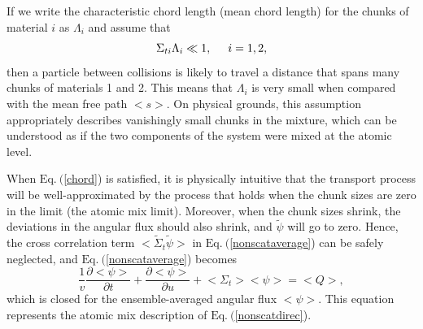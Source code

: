 \documentclass[12pt]{article}
\newcommand{\bl}{\big<}
\newcommand{\bg}{\big>}
\newcommand{\n}{ \noindent}
\begin{document}
If we write the characteristic chord length (mean chord length) for the chunks of material $i$ as $\Lambda_i$ and assume that
\begin{equation}\label{chord}
\Sigma_{ti}\Lambda_i \ll 1, \hspace{0.5 cm} i=1,2,
\end{equation}
then a particle between collisions is likely to travel a distance that spans many chunks of materials 1 and 2.
This means that $\Lambda_i$ is very small when compared with the mean free path $\bl s\bg$.
On physical grounds, this assumption appropriately describes vanishingly small chunks in the mixture, which can be understood as if the two components of the system were mixed at the atomic level.

When $\textrm{Eq.}\ ($\ref{chord}) is satisfied, it is physically intuitive that the transport process will be well-approximated by the process that holds when the chunk
sizes are zero in the limit (the atomic mix limit).
Moreover, when the chunk sizes shrink, the deviations in the angular flux should also shrink, and $\tilde \psi$ will go to zero.
Hence, the 
cross correlation term $\bl \tilde \Sigma_t \tilde \psi\bg$ in $\textrm{Eq.}\ ($\ref{nonscataverage}) can be safely neglected, and $\textrm{Eq.}\ ($\ref{nonscataverage}) becomes 
\begin{equation}
\frac{1}{v}\frac{\partial\bl\psi\bg}{\partial t}+\frac{\partial\bl\psi\bg}{\partial u}+
\bl\Sigma_t\bg\bl\psi\bg = \bl Q\bg,
\end{equation}
\n which is closed for the ensemble-averaged angular flux $\bl\psi\bg$.
This equation represents the atomic mix description of $\textrm{Eq.}\ ($\ref{nonscatdirec}).
\end{document}
